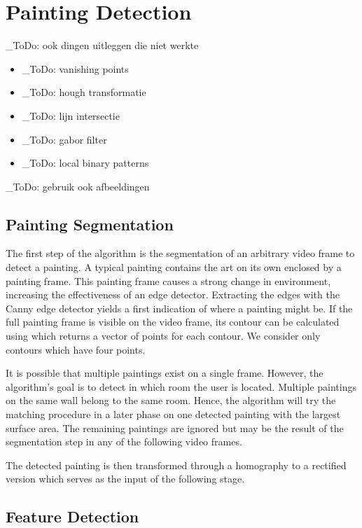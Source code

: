 \documentclass[10pt,final,journal]{IEEEtran}
\newcommand{\todo}[1]{\color{red}\_ToDo: #1 \color{black}}
\begin{document}
	\section{Painting Detection}
	\todo{ook dingen uitleggen die niet werkte}
	\begin{itemize}
		\item \todo{vanishing points}
		\item \todo{hough transformatie}
		\item \todo{lijn intersectie}
		\item \todo{gabor filter}
		\item \todo{local binary patterns}
	\end{itemize}

	\todo{gebruik ook afbeeldingen}
	
	\subsection{Painting Segmentation}
	The first step of the algorithm is the segmentation of an arbitrary video frame to detect a painting. A typical painting contains the art on its own enclosed by a painting frame. This painting frame causes a strong change in environment, increasing the effectiveness of an edge detector. Extracting the edges with the Canny edge detector yields a first indication of where a painting might be. If the full painting frame is visible on the video frame, its contour can be calculated using \cite{SUZUKI198532} which returns a vector of points for each contour. We consider only contours which have four points.
	
	It is possible that multiple paintings exist on a single frame. However, the algorithm's goal is to detect in which room the user is located. Multiple paintings on the same wall belong to the same room. Hence, the algorithm will try the matching procedure in a later phase on one detected painting with the largest surface area. The remaining paintings are ignored but may be the result of the segmentation step in any of the following video frames.
	
	The detected painting is then transformed through a homography to a rectified version which serves as the input of the following stage.
	
	\subsection{Feature Detection}
	
	
\end{document}
